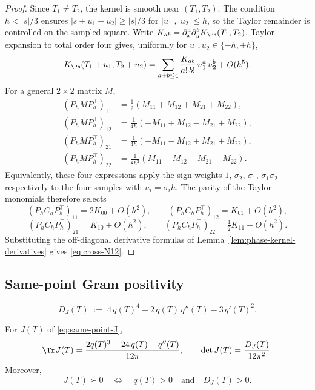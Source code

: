 \begin{proof}
Since \(T_1 \ne T_2\), the kernel is smooth near \((T_1, T_2)\).  The
condition \(h<|s|/3\) ensures
\(|s+u_1-u_2|\ge |s|/3\) for \(|u_1|,|u_2|\le h\), so the Taylor
remainder is controlled on the sampled square.  Write
\(K_{ab} = \partial_x^a \partial_y^b K_\Ph(T_1, T_2)\).  Taylor
expansion to total order four gives, uniformly for
\(u_1, u_2 \in \{-h, +h\}\),
\[
K_\Ph(T_1+u_1, T_2+u_2)
= \sum_{a+b\le 4}\frac{K_{ab}}{a!\,b!}\, u_1^a\, u_2^b + O(h^5).
\]
For a general \(2\times 2\) matrix \(M\),
\begin{align*}
(P_h M P_h^\top)_{11}
&= \tfrac12(M_{11} + M_{12} + M_{21} + M_{22}),\\
(P_h M P_h^\top)_{12}
&= \tfrac{1}{4h}(-M_{11} + M_{12} - M_{21} + M_{22}),\\
(P_h M P_h^\top)_{21}
&= \tfrac{1}{4h}(-M_{11} - M_{12} + M_{21} + M_{22}),\\
(P_h M P_h^\top)_{22}
&= \tfrac{1}{8h^2}(M_{11} - M_{12} - M_{21} + M_{22}).
\end{align*}
Equivalently, these four expressions apply the sign weights
\(1\), \(\sigma_2\), \(\sigma_1\), \(\sigma_1\sigma_2\) respectively to
the four samples with \(u_i = \sigma_i h\).  The parity of the Taylor
monomials therefore selects
\[
(P_h C_h P_h^\top)_{11} = 2 K_{00} + O(h^2),\qquad
(P_h C_h P_h^\top)_{12} = K_{01} + O(h^2),
\]
\[
(P_h C_h P_h^\top)_{21} = K_{10} + O(h^2),\qquad
(P_h C_h P_h^\top)_{22} = \tfrac12 K_{11} + O(h^2).
\]
Substituting the off-diagonal derivative formulas of
Lemma~\ref{lem:phase-kernel-derivatives} gives \eqref{eq:cross-N12}.
\end{proof}

\subsection{Same-point Gram positivity}
\label{subsec:same-point-gram-positivity}

\begin{definition}
\label{def:same-point-gram-determinant}
\begin{equation}
\label{eq:same-point-gram-determinant}
D_J(T) \;:=\; 4\,q(T)^4 + 2\,q(T)\,q''(T) - 3\,q'(T)^2.
\end{equation}
\end{definition}

\begin{lemma}
\label{lem:algebraic-same-point-gram-criterion}
For \(J(T)\) of \eqref{eq:same-point-J},
\begin{equation}
\label{eq:J-trace-det}
\Tr J(T) = \frac{2 q(T)^3 + 24\,q(T) + q''(T)}{12\pi},\qquad
\det J(T) = \frac{D_J(T)}{12\pi^2}.
\end{equation}
Moreover,
\[
        J(T)\succ 0
        \quad\Longleftrightarrow\quad
        q(T) > 0 \quad\text{and}\quad D_J(T) > 0.
\]
\end{lemma}

